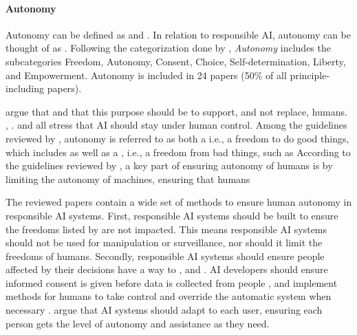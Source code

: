 \paragraph{Autonomy}
Autonomy can be defined as  and  \parencite{dictionary_autonomy}. In relation to responsible AI, autonomy can be thought of as  \parencite[p.~697-698]{Floridi_2018}. Following the categorization done by \textcite[Table 1]{Ryan_2021}, \textit{Autonomy} includes the subcategories Freedom, Autonomy, Consent, Choice, Self-determination, Liberty, and Empowerment. Autonomy is included in 24 papers (50\% of all principle-including papers).

\textcite[p.~5]{Rothenberger_2019} argue that  and that this purpose should be to support, and not replace, humans. \textcite[p.~387]{Thelisson_2018}, \textcite[p.~102]{Lu_2022}. \textcite[p.~53]{Fjeld_2020} and \textcite[p.~416]{Clarke_2019} all stress that AI should stay under human control. Among the guidelines reviewed by \textcite[p.~11]{Jobin_2019}, autonomy is referred to as both a  i.e., a freedom to do good things, which includes  as well as a , i.e., a freedom from bad things, such as  According to the guidelines reviewed by \textcite[p.~698]{Floridi_2018}, a key part of ensuring autonomy of humans is by limiting the autonomy of machines, ensuring that humans  

The reviewed papers contain a wide set of methods to ensure human autonomy in responsible AI systems. First, responsible AI systems should be built to ensure the freedoms listed by \textcite{Jobin_2019} are not impacted. This means responsible AI systems should not be used for manipulation or surveillance, nor should it limit the freedoms of humans. Secondly, responsible AI systems should ensure people affected by their decisions have a way to  \parencite[p.~102]{Lu_2022},  \parencite[p.~53]{Fjeld_2020} and  \parencite[p.~54]{Fjeld_2020}. AI developers should ensure informed consent is given before data is collected from people \parencite{Lukkien_2021,Jobin_2019}, and implement methods for humans to take control and override the automatic system when necessary \parencite{Floridi_2018,Rakova_2021}. \textcite{Liu_2021} argue that AI systems should adapt to each user, ensuring each person gets the level of autonomy and assistance as they need. 

